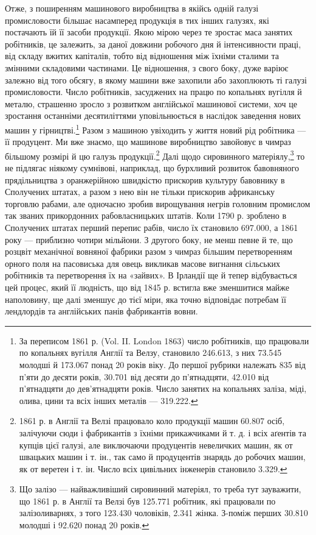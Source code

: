 Отже, з поширенням машинового виробництва в якійсь одній
галузі промисловости більшає насамперед продукція в тих інших
галузях, які постачають їй її засоби продукції. Якою мірою
через те зростає маса занятих робітників, це залежить, за
даної довжини робочого дня й інтенсивности праці, від складу
вжитих капіталів, тобто від відношення між їхніми сталими та
змінними складовими частинами. Це відношення, з свого боку,
дуже варіює залежно від того обсягу, в якому машини вже захопили
або захоплюють ті галузі промисловости. Число робітників,
засуджених на працю по копальнях вугілля й металю, страшенно
зросло з розвитком англійської машинової системи, хоч це зростання
останніми десятиліттями уповільнюється в наслідок заведення
нових машин у гірництві.\footnote{
За переписом 1861 р. (Vol. II. London 1863) число робітників,
що працювали по копальнях вугілля Англії та Велзу, становило 246.613,
з них 73.545 молодші й 173.067 понад 20 років віку. До першої рубрики
належать 835 від п’яти до десяти років, 30.701 від десяти до п’ятнадцяти,
42.010 від п’ятнадцяти до дев’ятнадцяти років. Число занятих
на копальнях заліза, міді, олива, цини та всіх інших металів — 319.222.
} Разом з машиною увіходить
у життя новий рід робітника — її продуцент. Ми вже знаємо, що
машинове виробництво завойовує в чимраз більшому розмірі й
цю галузь продукції.\footnote{
1861 р. в Англії та Велзі працювало коло продукції машин 60.807
осіб, залічуючи сюди і фабрикантів з їхніми прикажчиками й т. д. і всіх
аґентів та купців цієї галузі, але виключаючи продуцентів невеличких
машин, як от швацьких машин і т. ін., так само й продуцентів знарядь
до робочих машин, як от веретен і т. ін. Число всіх цивільних інженерів
становило 3.329.
} Далі щодо сировинного матеріялу,\footnote{
Що залізо — найважливіший сировинний матеріял, то треба тут
зауважити, що 1861 р. в Англії та Велзі був 125.771 робітник, які
працювали по залізоливарнях, з того 123.430 чоловіків, 2.341 жінка.
З-поміж перших 30.810 молодші і 92.620 понад 20 років.
} то не підлягає ніякому сумнівові, наприклад, що бурхливий розвиток
бавовняного прядільництва з оранжерійною швидкістю прискорив
культуру бавовнику в Сполучених штатах, а разом з нею
він не тільки прискорив африканську торговлю рабами, але
одночасно зробив вирощування негрів головним промислом так
званих прикордонних рабовласницьких штатів. Коли 1790 р.
зроблено в Сполучених штатах перший перепис рабів, число їх
становило 697.000, а 1861 року — приблизно чотири мільйони.
З другого боку, не менш певне й те, що розцвіт механічної вовняної
фабрики разом з чимраз більшим перетворенням орного поля на
пасовиська для овець викликав масове вигнання сільських робітників
та перетворення їх на «зайвих». В Ірландії ще й тепер
відбувається цей процес, який її людність, що від 1845 р. встигла
вже зменшитися майже наполовину, ще далі зменшує до тієї
міри, яка точно відповідає потребам її лендлордів та англійських
панів фабрикантів вовни.

